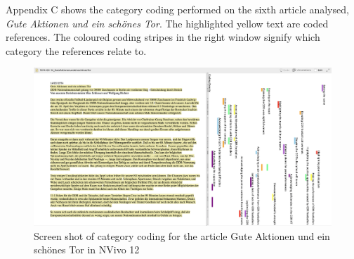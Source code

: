 Appendix C shows the category coding performed on the sixth article analysed, \textit{Gute Aktionen und ein schönes Tor}. The highlighted yellow text are coded references. The coloured coding stripes in the right window signify which category the references relate to. 

\begin{landscape}
\begin{figure}[h]
\centering
\bigskip\bigskip\bigskip
\caption{Screen shot of category coding for the article Gute Aktionen und ein schönes Tor in NVivo 12}
\includegraphics[width=\linewidth]{mres/images/appendix/c1.png}
\end{figure}
\end{landscape}
